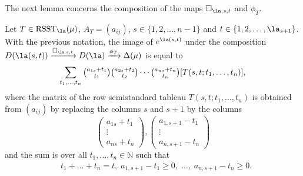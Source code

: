 The next lemma concerns the composition of the maps $\square_{\la, s, t}$ and $\phi_T$.
\begin{lemma}\label{comp2}
	Let  $T \in \mathrm{RSST}_{\la}(\mu)$, $A_T=(a_{ij})$, $s \in \{1,2,\dots,n-1\}$ and $t \in \{1,2,\dots,\la_{s+1}\}$. With the previous notation, the image of $e^{\la(s,t)}$ under the composition $D(\la(s,t)) \xrightarrow{\square_{\la, s,t}} D(\la) \xrightarrow{\phi_T} \Delta(\mu) $ is equal to \begin{equation}\label{eq11}
		\sum_{t_1,\dots,t_{n}}\tbinom{a_{1s}+t_1}{t_1}\tbinom{a_{2s}+t_2}{t_2} \cdots \tbinom{a_{ns}+t_n}{t_n}[T(s,t;t_1,\dots,t_{n})],\end{equation}
	where the matrix  of the row semistandard tableau $T(s,t;t_1,\dots,t_{n})$ is obtained from $(a_{ij})$ by replacing the columns $s$ and $s+1$ by the columns \[\begin{pmatrix}a_{1s}+t_1 \\ \vdots \\ a_{ns}+t_n \end{pmatrix}, \begin{pmatrix}a_{1,s+1}-t_1 \\ \vdots \\ a_{n,s+1}-t_n \end{pmatrix}\]
	and the sum is over all $t_1,\dots,t_{n} \in \mathbb{N}$ such that \begin{align}\label{ineq111}&t_{1}+\dots+t_{n}=t, \; a_{1,s+1}-t_1 \ge 0, \; \dots, \; a_{n,s+1}-t_{n} \ge 0.\end{align}
\end{lemma}
